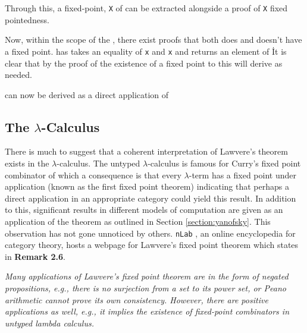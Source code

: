 
Through this, a fixed-point, \verb|X| of  can be extracted alongside a
proof of \verb|X| fixed pointedness.


Now, within the scope of the , there exist proofs that
 both does and doesn't have a fixed point.
 has takes an equality of  \verb|x|
and \verb|x| and returns an element of \. It is clear that by
the proof of the existence of a fixed point to this will derive  as
needed.


 can now be derived as a direct application
of 

\begin{AgdaMultiCode}
\end{AgdaMultiCode}
\subsection{The $\lambda$-Calculus}
\label{quote:lambda}
There is much to suggest that a coherent interpretation of Lawvere's theorem
exists in the $\lambda$-calculus. The untyped $\lambda$-calculus is famous for
Curry's fixed point combinator of which a consequence is that
every $\lambda$-term has a fixed point under application (known as the first
fixed point theorem) indicating that perhaps a direct
application in an appropriate category could yield this result. In addition to
this, significant results in different models of computation are given as an
application of the theorem as outlined in Section \ref{section:yanofsky}. This observation has not
gone unnoticed by others. \verb|nLab| \cite{nlab:homepage}, an online encyclopedia
for category theory,  hosts a webpage for Lawvere's fixed point
theorem \cite{nlab:lawvere's_fixed_point_theorem} which states in \textbf{Remark 2.6}.

\begin{displayquote}
\textit{Many applications of Lawvere’s fixed point theorem are in the form of negated
propositions, e.g., there is no surjection from a set to its power set, or
Peano arithmetic cannot prove its own consistency. However, there are positive
applications as well, e.g., it implies the existence of fixed-point combinators
in untyped lambda calculus.}
\end{displayquote}

